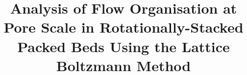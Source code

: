\setlength{\intextsep}{4pt plus 2pt minus 2pt}
\setlength{\textfloatsep}{6pt plus 2pt minus 2pt}
\setlength{\abovecaptionskip}{4pt}
\setlength{\belowcaptionskip}{0pt}


%
%
%
%
%
\makeatletter
\renewcommand\section{\@startsection{section}{1}{\z@}{0.8cm \@plus1ex \@minus .2ex}{0.1pt}{\normalfont\small\bfseries}}
\renewcommand\subsection{\@startsection{subsection}{2}{\z@}{.8cm \@plus1ex \@minus .2ex}{0.1pt}{\normalfont\small\bfseries}}
\renewcommand\subsubsection{\@startsection{subsubsection}{3}{\z@}{.8cm \@plus1ex \@minus .2ex}{0.1pt}{\normalfont\small\itshape}}
\makeatother



\title{Analysis of Flow Organisation at Pore Scale in Rotationally-Stacked Packed Beds Using the Lattice Boltzmann Method}


